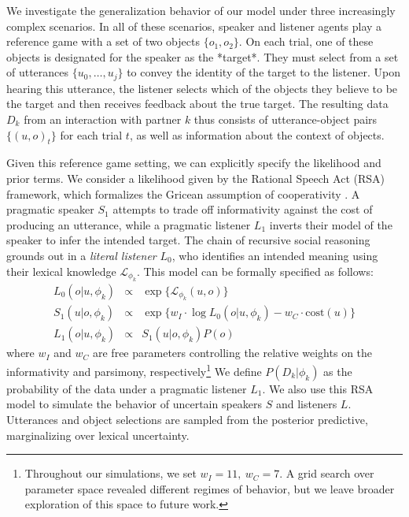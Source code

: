 We investigate the generalization behavior of our model under three increasingly complex scenarios. 
In all of these scenarios, speaker and listener agents play a reference game with a set of two objects $\{o_1, o_2\}$.
On each trial, one of these objects is designated for the speaker as the *target*. 
They must select from a set of utterances $\{u_0, \dots, u_j\}$ to convey the identity of the target to the listener.
Upon hearing this utterance, the listener selects which of the objects they believe to be the target and then receives feedback about the true target.
The resulting data $D_k$ from an interaction with partner $k$ thus consists of utterance-object pairs $\{(u, o)_t\}$ for each trial $t$, as well as information about the context of objects.

Given this reference game setting, we can explicitly specify the likelihood and prior terms. 
We consider a likelihood given by the Rational Speech Act (RSA) framework, which formalizes the Gricean assumption of cooperativity \cite{GoodmanFrank16_RSATiCS}.
A pragmatic speaker $S_1$ attempts to trade off informativity against the cost of producing an utterance, while a pragmatic listener $L_1$ inverts their model of the speaker to infer the intended target.
The chain of recursive social reasoning grounds out in a \emph{literal listener} $L_0$, who identifies an intended meaning using their lexical knowledge $\mathcal{L}_{\phi_k}$. 
This model can be formally specified as follows:
$$
\begin{array}{rcl}
L_0(o | u, \phi_k) &\propto  & \exp\{\mathcal{L}_{\phi_k}(u,o)\} \\
S_1(u | o, \phi_k) &\propto &  \exp\{w_I \cdot \log L_0(o | u, \phi_k) - w_C \cdot \textrm{cost}(u)\}   \\
L_1(o | u, \phi_k) &\propto  & S_1(u | o, \phi_k) P(o) 
\end{array}
$$
where $w_I$ and $w_C$ are free parameters controlling the relative weights on the informativity and parsimony, respectively\footnote{Throughout our simulations, we set $w_I = 11,~w_C = 7$. A grid search over parameter space revealed different regimes of behavior, but we leave broader exploration of this space to future work.}
We define $P(D_k | \phi_k)$ as the probability of the data under a pragmatic listener $L_1$.
We also use this RSA model to simulate the behavior of uncertain speakers $S$ and listeners $L$. 
Utterances and object selections are sampled from the posterior predictive, marginalizing over lexical uncertainty.

